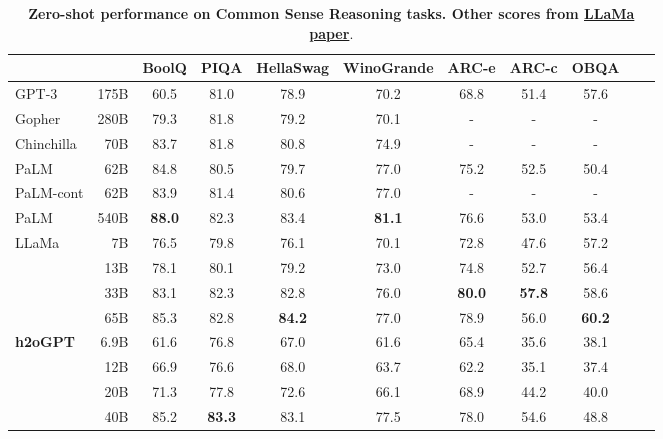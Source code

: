 \documentclass{article}
\begin{document}
\begin{table}[t!]
  \centering
  \setlength{\tabcolsep}{5pt}
  \begin{tabular}{lrccccccccc}
  \toprule
  & & BoolQ & PIQA & \hspace{-0.3cm} HellaSwag \hspace{-0.2cm} & \hspace{-0.2cm} WinoGrande \hspace{-0.3cm} & ARC-e & ARC-c & OBQA \\
  \midrule
  GPT-3        & 175B & 60.5 & 81.0 & 78.9 & 70.2 & 68.8 & 51.4 & 57.6 \\
  Gopher       & 280B & 79.3 & 81.8 & 79.2 & 70.1 & -    & -    & -    \\
  Chinchilla   & 70B  & 83.7 & 81.8 & 80.8 & 74.9 & -    & -    & -    \\
  PaLM         & 62B  & 84.8 & 80.5 & 79.7 & 77.0 & 75.2 & 52.5 & 50.4 \\
  PaLM-cont    & 62B  & 83.9 & 81.4 & 80.6 & 77.0 & -    & -    & -    \\
  PaLM         & 540B & \textbf{88.0} & 82.3 & 83.4 & \textbf{81.1} & 76.6 & 53.0 & 53.4 \\
  \midrule
  {LLaMa}
     & 7B  & 76.5 & 79.8          & 76.1          & 70.1 & 72.8          & 47.6          & 57.2 \\
     & 13B & 78.1 & 80.1          & 79.2          & 73.0 & 74.8          & 52.7          & 56.4 \\
     & 33B & 83.1 & 82.3          & 82.8          & 76.0 & \textbf{80.0} & \textbf{57.8} & 58.6 \\
     & 65B & 85.3 & 82.8 & \textbf{84.2} & 77.0 & 78.9          & 56.0          & \textbf{60.2} \\
  \midrule
  \textbf{h2oGPT}
    & 6.9B & 61.6 & 76.8 & 67.0 & 61.6 & 65.4 & 35.6 & 38.1 \\
    & 12B  & 66.9 & 76.6 & 68.0 & 63.7 & 62.2 & 35.1 & 37.4 \\
    & 20B  & 71.3 & 77.8 & 72.6 & 66.1 & 68.9 & 44.2 & 40.0 \\
    & 40B  & 85.2 & \textbf{83.3} & 83.1 & 77.5 & 78.0 & 54.6 & 48.8 \\

  \bottomrule
  \end{tabular}
  \caption{
  \textbf{Zero-shot performance on Common Sense Reasoning tasks. Other scores from \href{https://arxiv.org/abs/2302.13971}{LLaMa paper}}.
  \label{tab:commonsense}
  }
\end{table}
\end{document}

